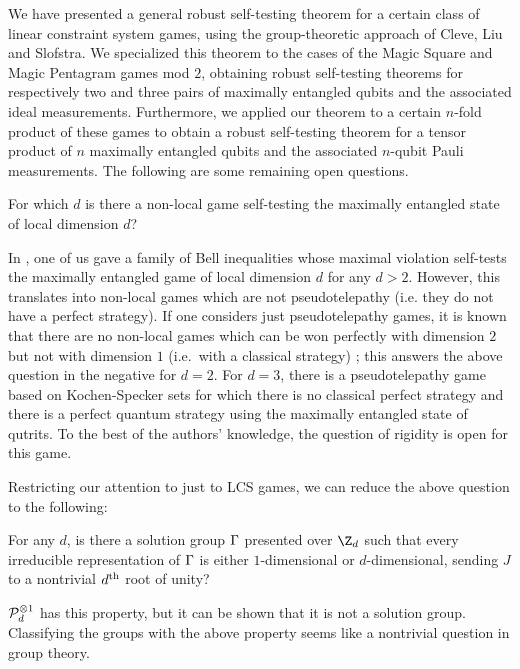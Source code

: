 We have presented a general robust self-testing theorem for a certain class of linear constraint system games, using the group-theoretic approach of Cleve, Liu and Slofstra. We specialized this theorem to the cases of the Magic Square and Magic Pentagram games mod $2$, obtaining robust self-testing theorems for respectively two and three pairs of maximally entangled qubits and the associated ideal measurements. Furthermore, we applied our theorem to a certain $n$-fold product of these games to obtain a robust self-testing theorem for a tensor product of $n$ maximally entangled qubits and the associated $n$-qubit Pauli measurements. The following are some remaining open questions.

\begin{question}
	For which $d$ is there a non-local game self-testing the maximally entangled state of local dimension $d$?
\end{question}
In \cite{coladangelo2018generalization}, one of us gave a family of Bell inequalities whose maximal violation self-tests the maximally entangled game of local dimension $d$ for any $d > 2$. However, this translates into non-local games which are not pseudotelepathy (i.e. they do not have a perfect strategy). 
If one considers just pseudotelepathy games, it is known that there are no non-local games which can be won perfectly with dimension $2$ but not with dimension $1$ (i.e.\ with a classical strategy) \cite{brassard2004minimum}; this answers the above question in the negative for $d=2$. For $d=3$, there is a pseudotelepathy game based on Kochen-Specker sets for which there is no classical perfect strategy and there is a perfect quantum strategy using the maximally entangled state of qutrits. \cite{cleve2004consequences} To the best of the authors' knowledge, the question of rigidity is open for this game.

Restricting our attention to just to LCS games, we can reduce the above question to the following:
\begin{question}
	For any $d$, is there a solution group $\Gamma$ presented over $\Z_d$ such that every irreducible representation of $\Gamma$ is either $1$-dimensional or $d$-dimensional, sending $J$ to a nontrivial $d\textsuperscript{th}$ root of unity? 
\end{question}
$\mathcal P_d^{\otimes 1}$ has this property, but it can be shown that it is not a solution group. 
Classifying the groups with the above property seems like a nontrivial question in group theory.


